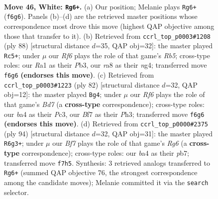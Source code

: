 \documentclass[11pt]{article}
\begin{document}
\clearpage

\begin{figure}[p]\centering
\begin{subfigure}{0.46\textwidth}\centering
\resizebox{\linewidth}{!}{%
\newchessgame
\chessboard[
  setfen={r7/1p3B2/p4R2/4P1kp/bP1r4/P6K/8/R7 w - - 5 46},
  showmover=false,
  pgfstyle=straightmove, color=movearrow, markmove={f6-g6}
]}
\caption{}
\end{subfigure}\hfill
\begin{subfigure}{0.46\textwidth}\centering
\resizebox{\linewidth}{!}{%
\newchessgame
\chessboard[
  setfen={8/4p2p/2k3p1/1R2p3/PB4n1/1P1K4/6rP/8 w - - 2 45},
  showmover=false,
  pgfstyle=straightmove, color=movearrow, markmove={b5-c5}
]}
\caption{}
\end{subfigure}
\\[4pt]
\begin{subfigure}{0.46\textwidth}\centering
\resizebox{\linewidth}{!}{%
\newchessgame
\chessboard[
  setfen={8/1b1B1r2/2pR4/1p4k1/4p2p/2P1K2P/1P6/8 w - - 2 42},
  showmover=false,
  pgfstyle=straightmove, color=movearrow, markmove={d7-g4}
]}
\caption{}
\end{subfigure}\hfill
\begin{subfigure}{0.46\textwidth}\centering
\resizebox{\linewidth}{!}{%
\newchessgame
\chessboard[
  setfen={4r3/1p6/p5R1/5r2/P1K5/2P4k/1P2p1R1/8 w - - 0 48},
  showmover=false,
  pgfstyle=straightmove, color=movearrow, markmove={g6-g3}
]}
\caption{}
\end{subfigure}
\caption{\textbf{Move 46, White: \texttt{Rg6+}.} (a) Our position; Melanie plays \texttt{Rg6+} (\texttt{f6g6}). Panels (b)--(d) are the retrieved master positions whose correspondence most drove this move (highest QAP objective among those that transfer to it). (b) Retrieved from \texttt{ccrl\_top\_p0003\#1208} (ply 88) [structural distance $d$=35, QAP obj=32]: the master played \texttt{Rc5+}; under $\mu$ our \emph{Rf6} plays the role of that game's \emph{Rb5}; cross-type roles: our \emph{R}a1 as their \emph{P}b3, our \emph{r}a8 as their \emph{n}g4; transferred move \texttt{f6g6} \textbf{(endorses this move)}. (c) Retrieved from \texttt{ccrl\_top\_p0003\#1223} (ply 82) [structural distance $d$=32, QAP obj=12]: the master played \texttt{Bg4}; under $\mu$ our \emph{Rf6} plays the role of that game's \emph{Bd7} (a \textbf{cross-type} correspondence); cross-type roles: our \emph{b}a4 as their \emph{P}c3, our \emph{B}f7 as their \emph{P}h3; transferred move \texttt{f6g6} \textbf{(endorses this move)}. (d) Retrieved from \texttt{ccrl\_top\_p0000\#2375} (ply 94) [structural distance $d$=32, QAP obj=31]: the master played \texttt{R6g3+}; under $\mu$ our \emph{Bf7} plays the role of that game's \emph{Rg6} (a \textbf{cross-type} correspondence); cross-type roles: our \emph{b}a4 as their \emph{p}b7; transferred move \texttt{f7h5}. Synthesis: 3 retrieved analogs transferred to \texttt{Rg6+} (summed QAP objective 76, the strongest correspondence among the candidate moves); Melanie committed it via the \texttt{search} selector.}
\label{fig:thought-m90}
\end{figure}
\end{document}
